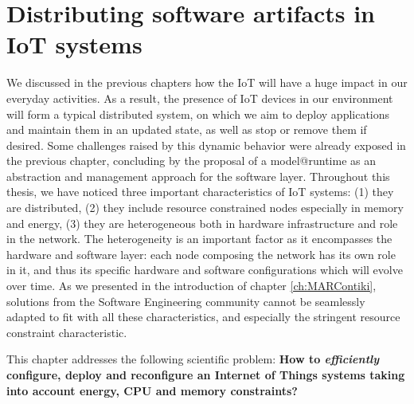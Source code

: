 \chapter{Distributing software artifacts in IoT systems}
\label{ch:softArtDist}
We discussed in the previous chapters how the IoT will have a huge impact in our everyday activities.
As a result, the presence of IoT devices in our environment will form a typical distributed system, on which we aim to deploy applications and maintain them in an updated state, as well as stop or remove them if desired.
Some challenges raised by this dynamic behavior were already exposed in the previous chapter, concluding by the proposal of a model@runtime as an abstraction and management approach for the software layer.
Throughout this thesis, we have noticed three important characteristics of IoT systems: (1) they are distributed, (2) they include resource constrained nodes especially in memory and energy, (3) they are heterogeneous both in hardware infrastructure and role in the network. 
The heterogeneity is an important factor as it encompasses the hardware and software layer: each node composing the network has its own role in it, and thus its specific hardware and software configurations which will evolve over time.
As we presented in the introduction of chapter \ref{ch:MARContiki}, solutions from the Software Engineering community cannot be seamlessly adapted to fit with all these characteristics, and especially the stringent resource constraint characteristic.

This chapter addresses the following scientific problem: \textbf{How to \textit{efficiently} configure, deploy and reconfigure an Internet of Things systems taking into account energy, CPU and memory constraints?}

